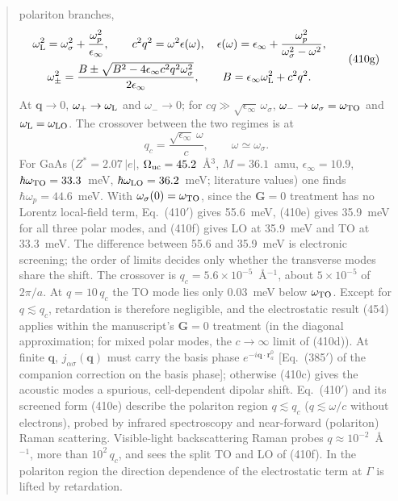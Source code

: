 \begin{quote}
polariton branches,
\begin{equation*}
\begin{gathered}
\omega^2_{\rm L}=\omega^2_\sigma+\frac{\omega_p^2}{\epsilon_\infty},\qquad
c^2q^2=\omega^2\epsilon(\omega),\quad \epsilon(\omega)=\epsilon_\infty+\frac{\omega_p^2}{\omega^2_\sigma-\omega^2},\\
\omega^2_\pm=\frac{B\pm\sqrt{B^2-4\epsilon_\infty c^2q^2\omega^2_\sigma}}{2\epsilon_\infty},\qquad B=\epsilon_\infty\omega^2_{\rm L}+c^2q^2 .
\end{gathered}
\tag{410g}
\end{equation*}
At $\mathbf q\to0$, $\omega_+\to\omega_{\rm L}$ and $\omega_-\to0$; for $cq\gg\sqrt{\epsilon_\infty}\,\omega_\sigma$,
$\omega_-\to\omega_\sigma=\omega_{\rm TO}$ and $\omega_{\rm L}=\omega_{\rm LO}$. The crossover
between the two regimes is at
\begin{equation*}
q_c=\frac{\sqrt{\epsilon_\infty}\,\omega}{c},\qquad \omega\simeq\omega_\sigma .
\tag{410h}
\end{equation*}
For GaAs ($Z^*=2.07\,|e|$, $\Omega_{\rm uc}=45.2$~\AA$^3$, $M=36.1$~amu, $\epsilon_\infty=10.9$,
$\hbar\omega_{\rm TO}=33.3$~meV, $\hbar\omega_{\rm LO}=36.2$~meV; literature values) one finds
$\hbar\omega_p=44.6$~meV. With $\omega_\sigma(0)=\omega_{\rm TO}$, since the $\mathbf G=0$
treatment has no Lorentz local-field term, Eq.~(410$'$) gives 55.6~meV, (410e) gives 35.9~meV
for all three polar modes, and (410f) gives LO at 35.9~meV and TO at 33.3~meV. The difference
between 55.6 and 35.9~meV is electronic screening; the order of limits decides only whether the
transverse modes share the shift. The crossover is $q_c=5.6\times10^{-5}$~\AA$^{-1}$, about
$5\times10^{-5}$ of $2\pi/a$. At $q=10\,q_c$ the TO mode lies only 0.03~meV below
$\omega_{\rm TO}$. Except for $q\lesssim q_c$, retardation is therefore negligible, and the
electrostatic result (454) applies within the manuscript's $\mathbf G=0$ treatment (in the
diagonal approximation; for mixed polar modes, the $c\to\infty$ limit of (410d)). At finite
$\mathbf q$, $j_{\alpha\sigma}(\mathbf q)$ must carry the basis phase
$e^{-i\mathbf q\cdot\mathbf r^0_a}$ [Eq.~(385$'$) of the companion correction on the basis
phase]; otherwise (410c) gives the acoustic modes a spurious, cell-dependent dipolar shift.
Eq.~(410$'$) and its screened form (410e) describe the polariton region $q\lesssim q_c$
($q\lesssim\omega/c$ without electrons), probed by infrared spectroscopy and near-forward
(polariton) Raman scattering. Visible-light backscattering Raman probes
$q\approx10^{-2}$~\AA$^{-1}$, more than $10^2\,q_c$, and sees the split TO and LO of (410f). In
the polariton region the direction dependence of the electrostatic term at $\Gamma$ is lifted by
retardation.
\end{quote}

